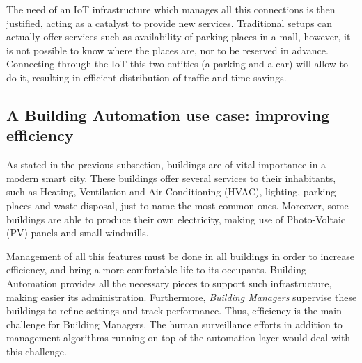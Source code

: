 The need of an IoT infrastructure which manages all this connections is then justified, acting as a catalyst to provide new services.
Traditional setups can actually offer services such as availability of parking places in a mall, however, it is not possible to know where the places are, nor to be reserved in advance.
Connecting through the IoT this two entities (a parking and a car) will allow to do it, resulting in efficient distribution of traffic and time savings.

\subsection{A Building Automation use case: improving efficiency}
\label{sec:BAScenario}
As stated in the previous subsection, buildings are of vital importance in a modern smart city.
These buildings offer several services to their inhabitants, such as Heating, Ventilation and Air Conditioning (HVAC), lighting, parking places and waste disposal, just to name the most common ones.
Moreover, some buildings are able to produce their own electricity, making use of Photo-Voltaic (PV) panels and small windmills.

Management of all this features must be done in all buildings in order to increase efficiency, and bring a more comfortable life to its occupants.
Building Automation provides all the necessary pieces to support such infrastructure, making easier its administration.
Furthermore, \textit{Building Managers} supervise these buildings to refine settings and track performance.
Thus, efficiency is the main challenge for Building Managers.
The human surveillance efforts in addition to management algorithms running on top of the automation layer would deal with this challenge.

